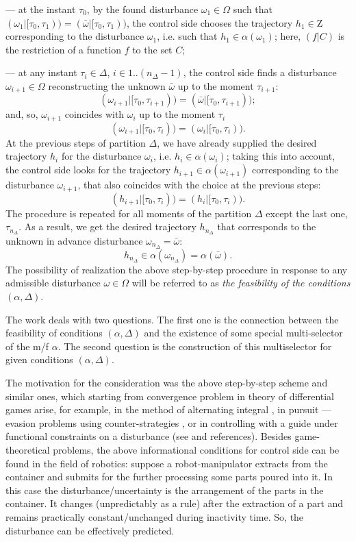 \documentclass[sn-mathphys,Numbered,pdflatex]{sn-jnl}%
\theoremstyle{thmstyleone}%
\theoremstyle{thmstyletwo}%
\theoremstyle{thmstylethree}%
\newcommand{\nint}[2]{{{#1}..{#2}}}%
\newcommand{\beq}{\begin{equation}}
\newcommand{\eeq}{\end{equation}}
\newcommand{\res}[2]{\ensuremath{(#1|#2)}}%
\newcommand{\naOm}{\ensuremath{\Omega}}%
\newcommand{\naZ}{\ensuremath{\mathrm{Z}}}%
\begin{document}
--- at the instant $\tau_0$, by the found disturbance $\omega_1\in\naOm$ such that $\res{\omega_1}{[\tau_0,\tau_1)}=\res{\bar\omega}{[\tau_0,\tau_1)}$,
the control side chooses the trajectory $h_1\in\naZ$ corresponding  to the disturbance $\omega_1$, i.e. such that $h_1\in\alpha(\omega_1)$; here, $\res{f}{C}$ is the restriction of a function $f$ to the set $C$;

--- at any instant $\tau_i\in\Delta$, $i\in\nint1{(n_\Delta-1)}$, the control side finds a disturbance $\omega_{i+1}\in \naOm$ reconstructing the unknown $\bar\omega$ up to the moment $\tau_{i+1}$:
\beq\label{omi-rec}
\res{\omega_{i+1}}{[\tau_0,\tau_{i+1})}=\res{\bar\omega}{[\tau_0,\tau_{i+1})};
\eeq
and, so, $\omega_{i+1}$ coincides with $\omega_{i}$ up to the moment $\tau_{i}$
\beq\label{omi-rec-2}
\res{\omega_{i+1}}{[\tau_0,\tau_{i})}=\res{\omega_i}{[\tau_0,\tau_{i})}.
\eeq
At the previous steps of partition $\Delta$, we have already supplied the desired trajectory $h_i$ for the disturbance $\omega_i$, i.e. $h_i\in\alpha(\omega_i)$;
taking this into account, the control side looks for the trajectory $h_{i+1}\in\alpha(\omega_{i+1})$ corresponding to the disturbance $\omega_{i+1}$, that also coincides with the choice at the previous steps:
$$
\res{h_{i+1}}{[\tau_0,\tau_i)}=\res{h_{i}}{[\tau_0,\tau_i)}.
$$
The procedure is repeated for all moments of the partition $\Delta$ except the last one, $\tau_{n_\Delta}$.
As a result, we get the desired trajectory $h_{n_\Delta}$ that corresponds to the unknown in advance disturbance $\omega_{n_\Delta}=\bar\omega$:
$$
h_{n_\Delta}\in\alpha(\omega_{n_\Delta})=\alpha(\bar\omega).
$$
The possibility of realization the above step-by-step procedure in response to any admissible disturbance $\omega\in\naOm$ will be referred to as \emph{the feasibility of the conditions $(\alpha, \Delta)$}.

The work deals with two questions.
The first one is the connection between the feasibility of conditions $(\alpha, \Delta)$ and the existence of some special multi-selector of the m/f $\alpha$.
The second question is the construction of this multiselector for given conditions $(\alpha, \Delta)$.

The motivation for the consideration was the above step-by-step scheme and similar ones, which starting from convergence problem \cite[sec.\,III]{Fleming:1961} in theory of differential games arise, for example, in the method of alternating integral \cite{Pontr1967et}, in pursuit --- evasion problems using counter-strategies  \cite{BlaPet-DGA2019,Chernov2014ARC,PetZen1996et}, or in con\-trol\-ling with a guide under functional constraints on a disturbance (see \cite{CheKhlo2005DU,GomSer-UDSU2021} and references).
Besides game-theoretical problems, the above informational conditions for control side can be found in the field of robotics: suppose a robot-manipulator extracts from the container and submits for the further processing some parts poured into it.
In this case the disturbance/uncertainty is the arrangement of the parts in the container.
It changes (unpredictably as a rule) after the extraction of a part and remains practically constant/unchanged during inactivity time.
So, the disturbance can be effectively predicted.
\end{document}
